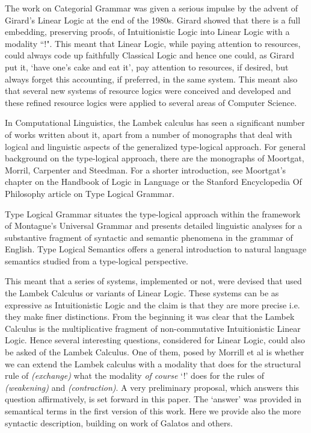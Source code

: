 \documentclass{article}
\begin{document}
The work on Categorial Grammar was given a serious impulse by the
advent of Girard's Linear Logic at the end of the 1980s.  Girard
showed that there is a full embedding, preserving proofs, of
Intuitionistic Logic into Linear Logic with a modality ``!". This
meant that Linear  Logic, while paying attention to resources, could always code up faithfully Classical Logic and hence one could, as Girard put it, `have one's cake and eat it', pay attention to resources, if desired, but always forget this accounting, if preferred, in the same system. This meant also that  several new systems of resource
logics were conceived and developed and these refined resource logics were applied to several areas of
Computer Science. 

In Computational Linguistics, the Lambek calculus 
has seen a significant number of works written
about it,  apart from a number of monographs that deal with
logical and linguistic aspects of the generalized type-logical
approach.  For general background on the type-logical approach, there
are the monographs of Moortgat, Morril,
Carpenter and Steedman. For a shorter introduction, see
Moortgat's chapter on the Handbook of Logic in Language \cite{?} 
or the Stanford Encyclopedia Of Philosophy article on Type Logical Grammar.

Type Logical Grammar situates the type-logical approach within the
framework of Montague's Universal Grammar and presents detailed
linguistic analyses for a substantive fragment of syntactic and
semantic phenomena in the grammar of English.  Type Logical Semantics
offers a general introduction to natural language semantics studied
from a type-logical perspective.



This meant that a series of systems, implemented or not, were devised
that used the Lambek Calculus or variants of Linear Logic. These
systems can be as expressive as Intuitionistic Logic and the claim is
that they are more precise i.e. they make finer distinctions.  From
the beginning it was clear that the Lambek Calculus is the
multiplicative fragment of non-commutative Intuitionistic Linear
Logic.  Hence several interesting questions, considered for Linear
Logic, could also be asked of the Lambek Calculus.  One of them, posed
by Morrill et al is whether we can extend the Lambek calculus with a
modality that does for the structural rule of \textit{(exchange)} what
the modality \textit{of course} `!' does for the rules of
\textit{(weakening)} and \textit{(contraction)}.  A very preliminary
proposal, which answers this question affirmatively, is set forward in
this paper. The `answer' was provided in semantical terms in the first
version of this work. Here we provide also the more syntactic
description, building on work of Galatos and others.
\end{document}
